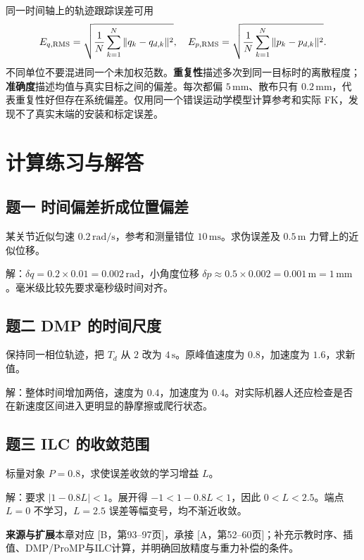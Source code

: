 同一时间轴上的轨迹跟踪误差可用
\begin{equation}
E_{q,\rm RMS}=\sqrt{\frac1N\sum_{k=1}^N\|q_k-q_{d,k}\|^2},\quad
E_{p,\rm RMS}=\sqrt{\frac1N\sum_{k=1}^N\|p_k-p_{d,k}\|^2}.
\end{equation}
不同单位不要混进同一个未加权范数。\textbf{重复性}描述多次到同一目标时的离散程度；\textbf{准确度}描述均值与真实目标之间的偏差。每次都偏 $5\,\mathrm{mm}$、散布只有 $0.2\,\mathrm{mm}$，代表重复性好但存在系统偏差。仅用同一个错误运动学模型计算参考和实际 FK，发现不了真实末端的安装和标定误差。

\section{计算练习与解答}

\subsection*{题一 时间偏差折成位置偏差}
某关节近似匀速 $0.2\,\mathrm{rad/s}$，参考和测量错位 $10\,\mathrm{ms}$。求伪误差及 $0.5\,\mathrm m$ 力臂上的近似位移。

解：$\delta q=0.2\times0.01=0.002\,\mathrm{rad}$，小角度位移 $\delta p\approx0.5\times0.002=0.001\,\mathrm m=1\,\mathrm{mm}$。毫米级比较先要求毫秒级时间对齐。

\subsection*{题二 DMP 的时间尺度}
保持同一相位轨迹，把 $T_d$ 从 $2$ 改为 $4\,\mathrm s$。原峰值速度为 $0.8$，加速度为 $1.6$，求新值。

解：整体时间增加两倍，速度为 $0.4$，加速度为 $0.4$。对实际机器人还应检查是否在新速度区间进入更明显的静摩擦或爬行状态。

\subsection*{题三 ILC 的收敛范围}
标量对象 $P=0.8$，求使误差收敛的学习增益 $L$。

解：要求 $|1-0.8L|<1$。展开得 $-1<1-0.8L<1$，因此 $0<L<2.5$。端点 $L=0$ 不学习，$L=2.5$ 误差等幅变号，均不渐近收敛。

\par\smallskip
{\small\noindent\textbf{来源与扩展}\quad 本章对应 [B，第93--97页]，承接 [A，第52--60页]；补充示教时序、插值、DMP/ProMP与ILC计算，并明确回放精度与重力补偿的条件。\par}
